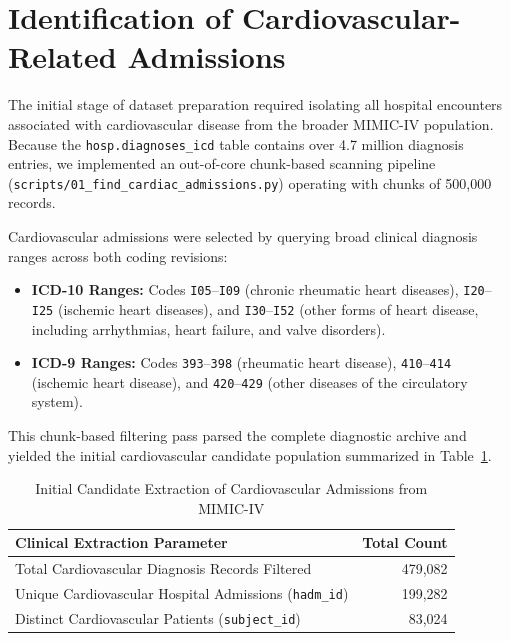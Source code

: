 \section{Identification of Cardiovascular-Related Admissions}
\label{sec:cardiac_admissions}

The initial stage of dataset preparation required isolating all hospital encounters associated with cardiovascular disease from the broader MIMIC-IV population. Because the \texttt{hosp.diagnoses\_icd} table contains over 4.7 million diagnosis entries, we implemented an out-of-core chunk-based scanning pipeline (\texttt{scripts/01\_find\_cardiac\_admissions.py}) operating with chunks of 500,000 records.

Cardiovascular admissions were selected by querying broad clinical diagnosis ranges across both coding revisions:
\begin{itemize}
    \item \textbf{ICD-10 Ranges:} Codes \texttt{I05}--\texttt{I09} (chronic rheumatic heart diseases), \texttt{I20}--\texttt{I25} (ischemic heart diseases), and \texttt{I30}--\texttt{I52} (other forms of heart disease, including arrhythmias, heart failure, and valve disorders).
    \item \textbf{ICD-9 Ranges:} Codes \texttt{393}--\texttt{398} (rheumatic heart disease), \texttt{410}--\texttt{414} (ischemic heart disease), and \texttt{420}--\texttt{429} (other diseases of the circulatory system).
\end{itemize}

This chunk-based filtering pass parsed the complete diagnostic archive and yielded the initial cardiovascular candidate population summarized in Table~\ref{tab:initial_extraction}.

\begin{table}[htbp]
\centering
\caption{Initial Candidate Extraction of Cardiovascular Admissions from MIMIC-IV}
\label{tab:initial_extraction}
\begin{tabular}{@{}lr@{}}
\toprule
\textbf{Clinical Extraction Parameter} & \textbf{Total Count} \\ \midrule
Total Cardiovascular Diagnosis Records Filtered & 479,082 \\
Unique Cardiovascular Hospital Admissions (\texttt{hadm\_id}) & 199,282 \\
Distinct Cardiovascular Patients (\texttt{subject\_id}) & 83,024 \\ \bottomrule
\end{tabular}
\end{table}

